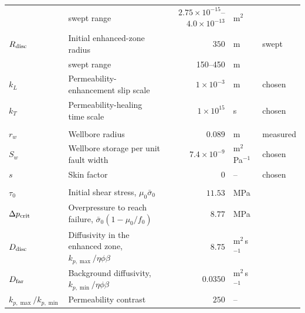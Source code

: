 \begin{table}[t]
\begin{tabular}{llrll}
  & \quad swept range & $2.75\times10^{-15}$--$4.0\times10^{-13}$ & m$^2$ &   \\
$R_{\rm disc}$ & Initial enhanced-zone radius & $350$ & m & swept \\
  & \quad swept range & 150--450 & m &   \\
$k_L$ & Permeability-enhancement slip scale & $1\times10^{-3}$ & m & chosen \\
$k_T$ & Permeability-healing time scale & $1\times10^{15}$ & s & chosen \\
\addlinespace
\multicolumn{5}{l}{\textit{Wellbore}} \\
$r_w$ & Wellbore radius & $0.089$ & m & measured \\
$S_w$ & Wellbore storage per unit fault width & $7.4\times10^{-9}$ & m$^2$\,Pa$^{-1}$ & chosen \\
$s$ & Skin factor & $0$ & -- & chosen \\
\addlinespace
\multicolumn{5}{l}{\textit{Derived}} \\
$\tau_0$ & Initial shear stress, $\mu_0\bar\sigma_0$ & $11.53$ & MPa &   \\
$\Delta p_{\rm crit}$ & Overpressure to reach failure, $\bar\sigma_0(1-\mu_0/f_0)$ & $8.77$ & MPa &   \\
$D_{\rm disc}$ & Diffusivity in the enhanced zone, $k_{p,\max}/\eta\phi\beta$ & $8.75$ & m$^2$\,s$^{-1}$ &   \\
$D_{\rm far}$ & Background diffusivity, $k_{p,\min}/\eta\phi\beta$ & $0.0350$ & m$^2$\,s$^{-1}$ &   \\
$k_{p,\max}/k_{p,\min}$ & Permeability contrast & $250$ & -- &   \\
\bottomrule
\end{tabular}
\end{table}
